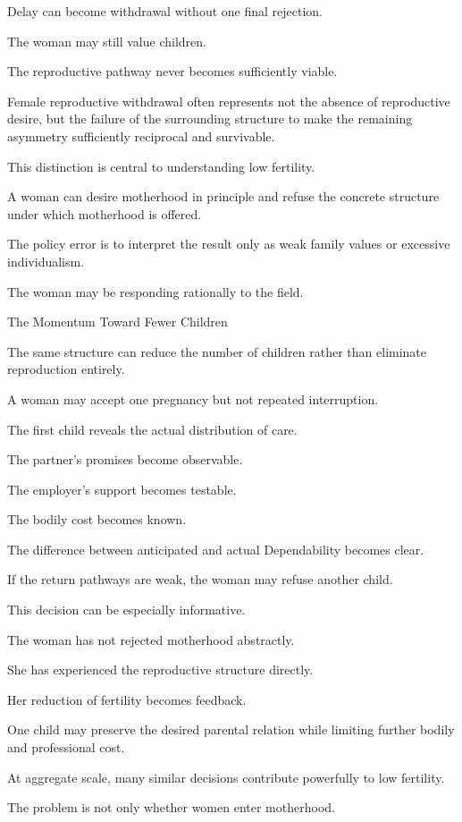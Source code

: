 Delay can become withdrawal without one final rejection.

The woman may still value children.

The reproductive pathway never becomes sufficiently viable.

Female reproductive withdrawal often represents not the absence of reproductive desire, but the failure of the surrounding structure to make the remaining asymmetry sufficiently reciprocal and survivable.

This distinction is central to understanding low fertility.

A woman can desire motherhood in principle and refuse the concrete structure under which motherhood is offered.

The policy error is to interpret the result only as weak family values or excessive individualism.

The woman may be responding rationally to the field.

The Momentum Toward Fewer Children

The same structure can reduce the number of children rather than eliminate reproduction entirely.

A woman may accept one pregnancy but not repeated interruption.

The first child reveals the actual distribution of care.

The partner’s promises become observable.

The employer’s support becomes testable.

The bodily cost becomes known.

The difference between anticipated and actual Dependability becomes clear.

If the return pathways are weak, the woman may refuse another child.

This decision can be especially informative.

The woman has not rejected motherhood abstractly.

She has experienced the reproductive structure directly.

Her reduction of fertility becomes feedback.

One child may preserve the desired parental relation while limiting further bodily and professional cost.

At aggregate scale, many similar decisions contribute powerfully to low fertility.

The problem is not only whether women enter motherhood.


